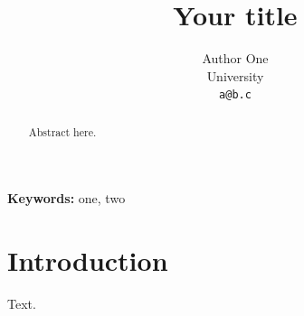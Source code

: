 \documentclass[11pt,a4paper]{article}
\title{Your title}
\author{Author One\\University\\\texttt{a@b.c}}
\date{}
\begin{document}
\maketitle
\begin{abstract}
Abstract here.
\end{abstract}
\noindent\textbf{Keywords:} one, two
\section{Introduction}
Text.


\end{document}
